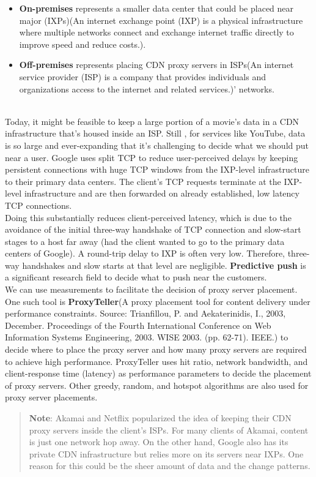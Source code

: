 \begin{itemize}
\item
\protect{}\label{cIAvondxqBaUvg-8qe8DE}
\textbf{On-premises} represents a smaller data center that could be placed near major (IXPs)(An internet exchange point (IXP) is a physical infrastructure where multiple networks connect and exchange internet traffic directly to improve speed and reduce costs.).
\item
\protect{}\label{8GpkwrTxjO3BcK8i3hxX0}
\textbf{Off-premises} represents placing CDN proxy servers in ISPs(An internet service provider (ISP) is a company that provides individuals and organizations access to the internet and related services.)' networks.
\end{itemize}
\\
Today, it might be feasible to keep a large portion of a movie's data in a CDN infrastructure that's housed inside an ISP. Still , for services like YouTube, data is so large and ever-expanding that it's challenging to decide what we should put near a user. Google uses split TCP to reduce user-perceived delays by keeping persistent connections with huge TCP windows from the IXP-level infrastructure to their primary data centers. The client's TCP requests terminate at the IXP-level infrastructure and are then forwarded on already established, low latency TCP connections.
\\
Doing this substantially reduces client-perceived latency, which is due to the avoidance of the initial three-way handshake of TCP connection and slow-start stages to a host far away (had the client wanted to go to the primary data centers of Google). A round-trip delay to IXP is often very low. Therefore, three-way handshakes and slow starts at that level are negligible. \textbf{Predictive push} is a significant research field to decide what to push near the customers.
\\
We can use measurements to facilitate the decision of proxy server placement. One such tool is \textbf{ProxyTeller}(A proxy placement tool for content delivery under performance constraints. Source: Trianfillou, P. and Aekaterinidis, I., 2003, December. Proceedings of the Fourth International Conference on Web Information Systems Engineering, 2003. WISE 2003. (pp. 62-71). IEEE.) to decide where to place the proxy server and how many proxy servers are required to achieve high performance. ProxyTeller uses hit ratio, network bandwidth, and client-response time (latency) as performance parameters to decide the placement of proxy servers. Other greedy, random, and hotspot algorithms are also used for proxy server placements.
\begin{quote}
\textbf{Note}: Akamai and Netflix popularized the idea of keeping their CDN proxy servers inside the client's ISPs. For many clients of Akamai, content is just one network hop away. On the other hand, Google also has its private CDN infrastructure but relies more on its servers near IXPs. One reason for this could be the sheer amount of data and the change patterns.
\end{quote}

